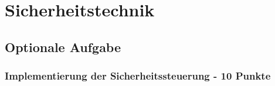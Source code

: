 \section{Sicherheitstechnik} \label{cpt:Sicherheitstechnik}

\subsection{Optionale Aufgabe}

\subsubsection{Implementierung der Sicherheitssteuerung - 10 Punkte}


\newpage
